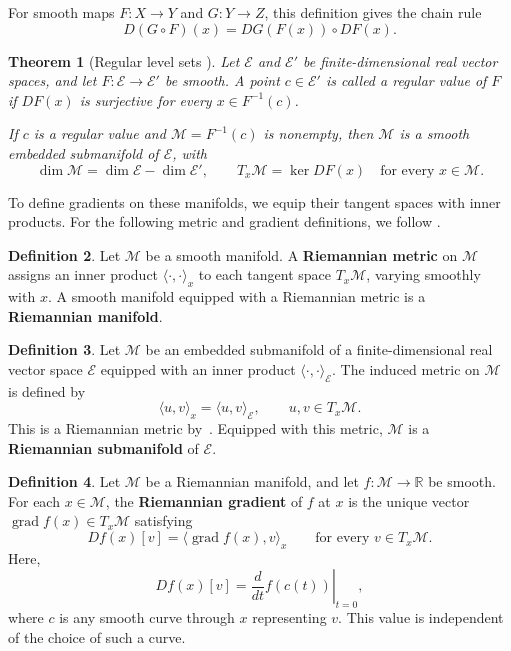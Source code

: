 \documentclass[12pt]{article}
\theoremstyle{definition}
\newtheorem{definition}{Definition}[section]
\theoremstyle{plain}
\newtheorem{theorem}[definition]{Theorem}
\theoremstyle{remark}
\DeclareMathOperator{\grad}{grad}            %
\begin{document}
For smooth maps \( F : X \longrightarrow Y \) and \( G : Y \longrightarrow Z \), this definition gives the chain rule
\[
  D(G \circ F)(x) = DG(F(x)) \circ DF(x).
\]

\begin{theorem}[Regular level sets {\cite[Proposition 3.16 and Lemma 5.13]{segal}}]\label{thm:regular-value}
  Let \( \mathcal{E} \) and \( \mathcal{E'} \) be finite-dimensional real vector spaces, and let \( F : \mathcal{E} \rightarrow \mathcal{E'} \) be smooth.
  A point \( c \in \mathcal{E'} \) is called a regular value of \( F \) if \( DF(x) \) is surjective for every \( x \in F^{-1}(c) \).

  If \(c\) is a regular value and \( \mathcal M = F^{-1}(c)\) is nonempty, then \(\mathcal M\) is a smooth embedded submanifold of \(\mathcal E\), with
  \[
    \dim\mathcal M=\dim\mathcal E-\dim\mathcal E', \qquad T_x\mathcal M = \ker DF(x) \quad \text{for every } x \in \mathcal{M}.
  \]
\end{theorem}

To define gradients on these manifolds, we equip their tangent spaces with inner products. For the following metric and gradient definitions, we follow \cite[Definitions 3.51--3.53, Proposition 3.54, and Definitions 3.55, 3.58 and 3.60]{boumal}.

\begin{definition}\label{def:riemannian-manifold}
  Let \( \mathcal{M} \) be a smooth manifold. A \textbf{Riemannian metric} on \( \mathcal{M} \) assigns an inner product \( \langle \cdot, \cdot \rangle_x \) to each tangent space \( T_x\mathcal{M} \), varying smoothly with \( x \).
  A smooth manifold equipped with a Riemannian metric is a \textbf{Riemannian manifold}.
\end{definition}

\begin{definition}\label{def:riemannian-submanifold}
  Let \(\mathcal M\) be an embedded submanifold of a finite-dimensional real vector space \(\mathcal E\) equipped with an inner product \(\langle\cdot,\cdot\rangle_{\mathcal E}\).
  The induced metric on \(\mathcal M\) is defined by
  \[
    \langle u,v\rangle_x=\langle u,v\rangle_{\mathcal E}, \qquad u,v\in T_x\mathcal M.
  \]
  This is a Riemannian metric by~\cite[Proposition 3.54]{boumal}. Equipped with this metric, \(\mathcal M\) is a \textbf{Riemannian submanifold} of \(\mathcal E\).
\end{definition}

\begin{definition}\label{def:riemannian-gradient}
  Let \( \mathcal{M} \) be a Riemannian manifold, and let \( f : \mathcal{M} \rightarrow \mathbb{R} \) be smooth.
  For each \( x \in \mathcal{M} \), the \textbf{Riemannian gradient} of \( f \) at \( x \) is the unique vector \( \grad f(x) \in T_x\mathcal{M} \) satisfying
  \[
    Df(x)[v] = \langle \grad f(x), v\rangle _x \qquad \text{for every } v \in T_x \mathcal{M}.
  \]
  Here,
  \[
    Df(x)[v] = \left.\frac{d}{dt}f(c(t))\right|_{t=0},
  \]
  where \(c\) is any smooth curve through \(x\) representing \(v\).
  This value is independent of the choice of such a curve.
\end{definition}
\end{document}
